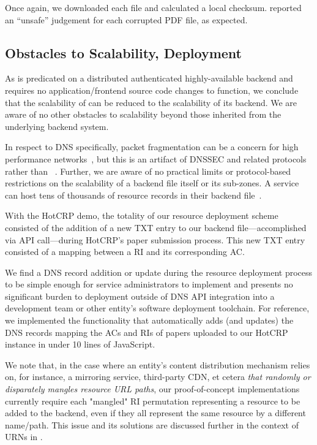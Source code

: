 Once again, we downloaded each file and calculated a local checksum. \DHTSYS{}
reported an ``unsafe'' judgement for each corrupted PDF file, as expected.

\subsection{Obstacles to Scalability, Deployment}

As \SYSTEM{} is predicated on a distributed authenticated highly-available
backend and requires no application/frontend source code changes to function, we
conclude that the scalability of \SYSTEM{} can be reduced to the scalability of
its backend. We are aware of no other obstacles to scalability beyond those
inherited from the underlying backend system.

In respect to DNS specifically, packet fragmentation can be a concern for high
performance networks~\cite{EDNS}, but this is an artifact of DNSSEC and related
protocols rather than \SYSTEM{}~\cite{DNSSEC}. Further, we are aware of no
practical limits or protocol-based restrictions on the scalability of a backend
file itself or its sub-zones. A service can host tens of thousands of resource
records in their backend file~\cite{DNS1, DNS2}.

With the HotCRP demo, the totality of our resource deployment scheme consisted
of the addition of a new TXT entry to our backend file---accomplished via API
call---during HotCRP's paper submission process. This new TXT entry consisted of
a mapping between a RI and its corresponding AC.

We find a DNS record addition or update during the resource deployment process
to be simple enough for service administrators to implement and presents no
significant burden to deployment outside of DNS API integration into a
development team or other entity's software deployment toolchain. For reference,
we implemented the functionality that automatically adds (and updates) the DNS
records mapping the ACs and RIs of papers uploaded to our HotCRP instance in
under 10 lines of JavaScript.

We note that, in the case where an entity's content distribution mechanism
relies on, for instance, a mirroring service, third-party CDN, et cetera
\emph{that randomly or disparately mangles resource URL paths}, our
proof-of-concept implementations currently require each "mangled" RI permutation
representing a resource to be added to the backend, even if they all represent
the same resource by a different name/path. This issue and its solutions are
discussed further in the context of URNs in .

